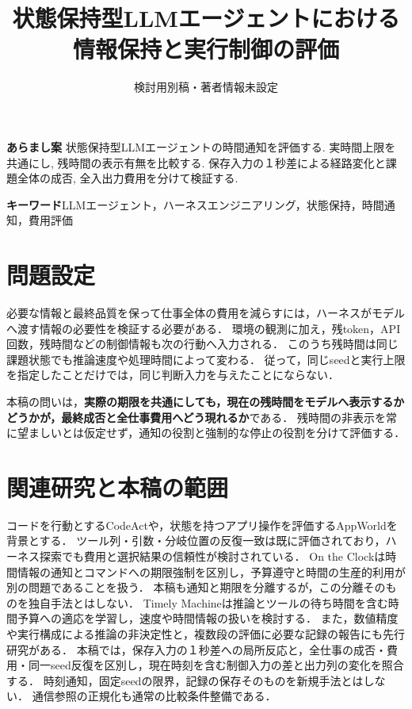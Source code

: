 \documentclass[uplatex,a4paper,twocolumn,10pt]{jsarticle}
\title{状態保持型LLMエージェントにおける\newline 情報保持と実行制御の評価}
\author{検討用別稿・著者情報未設定}
\date{}
\begin{document}
\raggedbottom
\maketitle
\noindent\textbf{あらまし案}\quad
状態保持型LLMエージェントの時間通知を評価する. 実時間上限を共通にし, 残時間の表示有無を比較する. 保存入力の１秒差による経路変化と課題全体の成否, 全入出力費用を分けて検証する.

\noindent\textbf{キーワード}\quad LLMエージェント，ハーネスエンジニアリング，状態保持，時間通知，費用評価

\section{問題設定}
必要な情報と最終品質を保って仕事全体の費用を減らすには，ハーネスがモデルへ渡す情報の必要性を検証する必要がある．
環境の観測に加え，残token，API回数，残時間などの制御情報も次の行動へ入力される．
このうち残時間は同じ課題状態でも推論速度や処理時間によって変わる．
従って，同じseedと実行上限を指定したことだけでは，同じ判断入力を与えたことにならない．

本稿の問いは，\textbf{実際の期限を共通にしても，現在の残時間をモデルへ表示するかどうかが，最終成否と全仕事費用へどう現れるか}である．
残時間の非表示を常に望ましいとは仮定せず，通知の役割と強制的な停止の役割を分けて評価する．

\section{関連研究と本稿の範囲}
コードを行動とするCodeAct\cite{codeact}や，状態を持つアプリ操作を評価するAppWorld\cite{appworld}を背景とする．
ツール列・引数・分岐位置の反復一致は既に評価されており\cite{consistency}，ハーネス探索でも費用と選択結果の信頼性が検討されている\cite{beyondprompts}．
On the Clock\cite{clock}は時間情報の通知とコマンドへの期限強制を区別し，予算遵守と時間の生産的利用が別の問題であることを扱う．
本稿も通知と期限を分離するが，この分離そのものを独自手法とはしない．
Timely Machine\cite{timely}は推論とツールの待ち時間を含む時間予算への適応を学習し，速度や時間情報の扱いを検討する．
また，数値精度や実行構成による推論の非決定性\cite{nondeterminism}と，複数段の評価に必要な記録の報告\cite{repro}にも先行研究がある．
本稿では，保存入力の１秒差への局所反応と，全仕事の成否・費用・同一seed反復を区別し，現在時刻を含む制御入力の差と出力列の変化を照合する．
時刻通知，固定seedの限界，記録の保存そのものを新規手法とはしない．
通信参照の正規化も通常の比較条件整備である．
\end{document}

